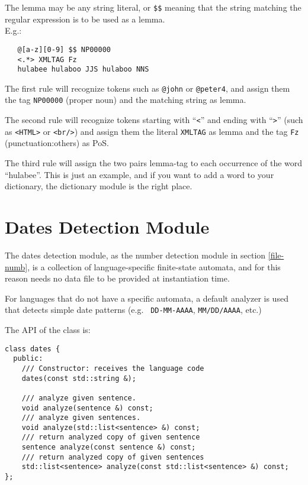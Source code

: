 \documentclass[a4paper]{book}
\begin{document}
 The lemma may be any string literal, or \verb#$$# meaning that the
 string matching the regular expression is to be used as a
 lemma.\\
 E.g.:
\begin{verbatim}  
   @[a-z][0-9] $$ NP00000
   <.*> XMLTAG Fz
   hulabee hulaboo JJS hulaboo NNS
\end{verbatim}

  The first rule will recognize tokens such as \verb#@john# or
  \verb#@peter4#, and assign them the tag \verb#NP00000# (proper noun)
  and the matching string as lemma.

  The second rule will recognize tokens starting with ``\verb#<#'' and
  ending with ``\verb#>#'' (such as \verb#<HTML># or \verb#<br/>#) and
  assign them the literal \verb#XMLTAG# as lemma and the tag \verb#Fz#
  (punctuation:others) as PoS.

  The third rule will assign the two pairs lemma-tag to each occurrence
  of the word ``hulabee''. This is just an example, and if you want to
  add a word to your dictionary, the dictionary module is the right place.
  

\section{Dates Detection Module}
\label{file-dates}

  The dates detection module, as the number detection module in
  section \ref{file-numb}, is a collection of language-specific
  finite-state automata, and for this reason needs no data file to be
  provided at instantiation time.

  For languages that do not have a specific automata, a default
  analyzer is used that detects simple date patterns (e.g. {\tt
    DD-MM-AAAA}, {\tt MM/DD/AAAA}, etc.)

  The API of the class is:
\begin{verbatim}        
class dates {             
  public:   
    /// Constructor: receives the language code
    dates(const std::string &); 

    /// analyze given sentence.
    void analyze(sentence &) const;
    /// analyze given sentences.
    void analyze(std::list<sentence> &) const;
    /// return analyzed copy of given sentence
    sentence analyze(const sentence &) const;
    /// return analyzed copy of given sentences
    std::list<sentence> analyze(const std::list<sentence> &) const;
};  
\end{verbatim}        
\end{document}
